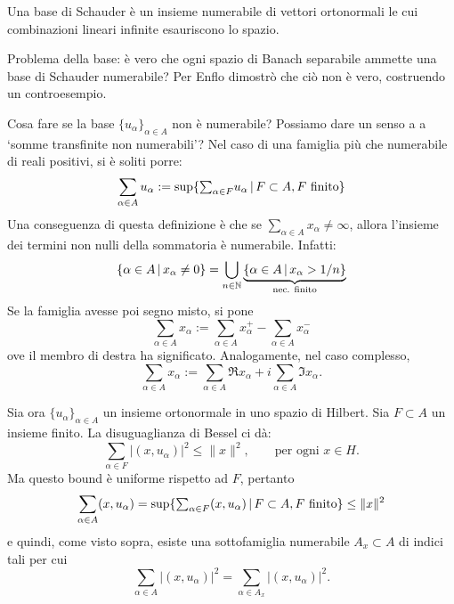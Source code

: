 \begin{definition}
	Una base di Schauder è un insieme numerabile di vettori ortonormali le cui combinazioni lineari infinite esauriscono lo spazio.
\end{definition}

Problema della base: è vero che ogni spazio di Banach separabile ammette una base di Schauder numerabile?
Per Enflo \cite{enflo1973counterexample} dimostrò che ciò non è vero, costruendo un controesempio.

Cosa fare se la base $\{u_\alpha\}_{\alpha \in A}$ non è numerabile? Possiamo dare un senso a a `somme transfinite non numerabili'? Nel caso di una famiglia più che numerabile di reali positivi, si è soliti porre:%
\begin{equation*}
	\sum_{\alpha \in A} u_\alpha := \sup \{ {\textstyle \sum_{\alpha \in F}} u_\alpha \,|\, F \subset A, \text{$F$ finito} \}
\end{equation*}
Una conseguenza di questa definizione è che se $\sum_{\alpha \in A} x_\alpha \neq \infty$, allora l'insieme dei termini non nulli della sommatoria è numerabile. Infatti:
\begin{equation*}
	\{\alpha \in A \,|\, x_\alpha \neq 0 \} = \bigcup_{n \in \mathbb{N}} \underbrace{\{ \alpha \in A \,|\, x_\alpha > 1/n \}}_{\text{nec. finito}}
\end{equation*}
Se la famiglia avesse poi segno misto, si pone
\begin{equation*}
	\sum_{\alpha \in A} x_\alpha := \sum_{\alpha \in A} x_\alpha^+ - \sum_{\alpha \in A} x_\alpha^-
\end{equation*}
ove il membro di destra ha significato. Analogamente, nel caso complesso,
\begin{equation*}
	\sum_{\alpha \in A} x_\alpha := \sum_{\alpha \in A} \Re{x_\alpha} + i \sum_{\alpha \in A} \Im{x_\alpha}.
\end{equation*}

Sia ora $\{u_\alpha\}_{\alpha \in A}$ un insieme ortonormale in uno spazio di Hilbert. Sia $F \subset A$ un insieme finito. La disuguaglianza di Bessel ci dà:
\begin{equation*}
	\sum_{\alpha \in F}|(x,u_\alpha)|^2 \leq \|x\|^2, \qquad \text{per ogni $x \in H$}.
\end{equation*}
Ma questo bound è uniforme rispetto ad $F$, pertanto
\begin{equation*}
	\sum_{\alpha \in A} (x, u_\alpha) = \sup \{ {\textstyle \sum_{\alpha \in F}} (x,u_\alpha) \,|\, F \subset A, \text{$F$ finito} \} \leq \|x\|^2
\end{equation*}
e quindi, come visto sopra, esiste una sottofamiglia numerabile $A_x \subset A$ di indici tali per cui
\begin{equation*}
	\sum_{\alpha \in A} |(x,u_\alpha)|^2 = \sum_{\alpha \in A_x} |(x,u_\alpha)|^2.
\end{equation*}

